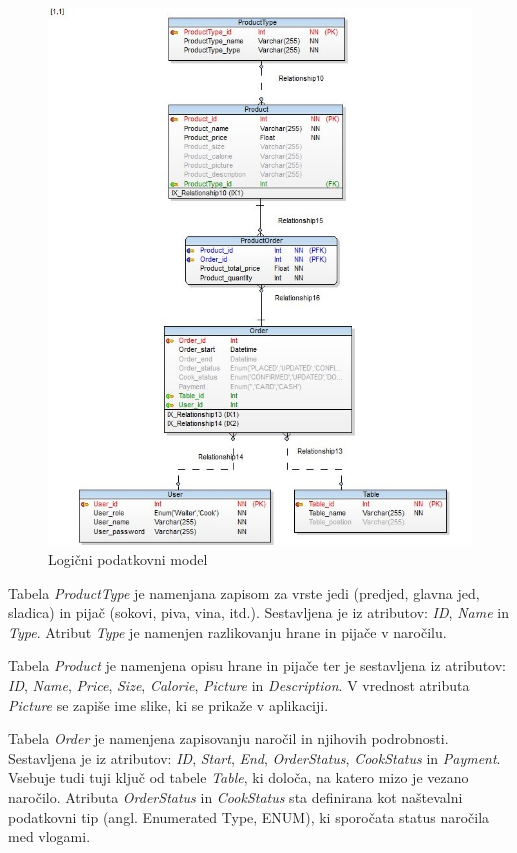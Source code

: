 \documentclass[a4paper, 12pt]{book}
\begin{document}
\begin{figure}[!htb]
\centering
\includegraphics[width=12cm]{Database_physical}
\caption{Logični podatkovni model}
\label{Database_physical}
\end{figure}

Tabela \textit{ProductType} je namenjana zapisom za vrste jedi (predjed, glavna jed, sladica) in pijač (sokovi, piva, vina, itd.). Sestavljena je iz atributov: \textit{ID}, \textit{Name} in \textit{Type}. Atribut \textit{Type} je namenjen razlikovanju hrane in pijače v naročilu.

Tabela \textit{Product} je namenjena opisu hrane in pijače ter je sestavljena iz atributov: \textit{ID}, \textit{Name}, \textit{Price}, \textit{Size}, \textit{Calorie}, \textit{Picture} in \textit{Description}. V vrednost atributa \textit{Picture} se zapiše ime slike, ki se prikaže v aplikaciji.

Tabela \textit{Order} je namenjena zapisovanju naročil in njihovih podrobnosti. Sestavljena je iz atributov: \textit{ID}, \textit{Start}, \textit{End}, \textit{OrderStatus}, \textit{CookStatus} in \textit{Payment}. Vsebuje tudi tuji ključ od tabele \textit{Table}, ki določa, na katero mizo je vezano naročilo. Atributa \textit{OrderStatus} in \textit{CookStatus} sta definirana kot naštevalni podatkovni tip (angl. Enumerated Type, ENUM), ki sporočata status naročila med vlogami.
\end{document}
